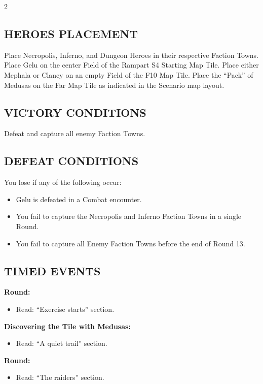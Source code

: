 \begin{multicols*}{2}
\subsection*{\MakeUppercase{Heroes Placement}}

Place Necropolis, Inferno, and Dungeon Heroes in their respective Faction Towns.
Place Gelu on the center Field of the Rampart S4 Starting Map Tile.
Place either Mephala or Clancy on an empty Field of the F10 Map Tile.
Place the ``Pack'' of Medusas on the Far Map Tile as indicated in the Scenario map layout.

\subsection*{\MakeUppercase{Victory Conditions}}

Defeat and capture all enemy Faction Towns.

\subsection*{\MakeUppercase{Defeat Conditions}}

You lose if any of the following occur:
\begin{itemize}
  \item Gelu is defeated in a Combat encounter.
  \item You fail to capture the Necropolis and Inferno Faction Towns in a single Round.
  \item You fail to capture all Enemy Faction Towns before the end of Round 13.
\end{itemize}

\subsection*{\MakeUppercase{Timed Events}}

\textbf{ Round:}
\begin{itemize}
  \item Read: ``Exercise starts'' section.
  \end{itemize}

\textbf{Discovering the Tile with Medusas:}
\begin{itemize}
  \item Read: ``A quiet trail'' section.
\end{itemize}

\textbf{ Round:}
\begin{itemize}
  \item Read: ``The raiders'' section.
\end{itemize}


\end{multicols*}
